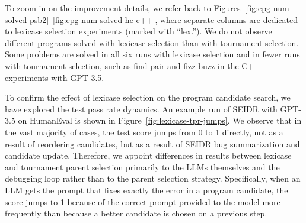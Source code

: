 To zoom in on the improvement details, we refer back to Figures~\ref{fig:epg-num-solved-psb2}--\ref{fig:epg-num-solved-he-c++}, where separate columns are dedicated to lexicase selection experiments (marked with ``lex.'').
We do not observe different programs solved with lexicase selection than with tournament selection. 
Some problems are solved in all six runs with lexicase selection and in fewer runs with tournament selection, such as find-pair and fizz-buzz in the C++ experiments with GPT-3.5.

To confirm the effect of lexicase selection on the program candidate search, we have explored the test pass rate dynamics.
An example run of SEIDR with GPT-3.5 on HumanEval is shown in Figure~\ref{fig:lexicase-tpr-jumps}.
We observe that in the vast majority of cases, the test score jumps from 0 to 1 directly, not as a result of reordering candidates, but as a result of SEIDR  bug summarization and candidate update.
Therefore, we appoint differences in results between lexicase and tournament parent selection primarily to the LLMs themselves and the debugging loop rather than to the parent selection strategy. 
Specifically, when an LLM gets the prompt that fixes exactly the error in a program candidate, the score jumps to 1 because of the correct prompt provided to the model more frequently than because a better candidate is chosen on a previous step.






